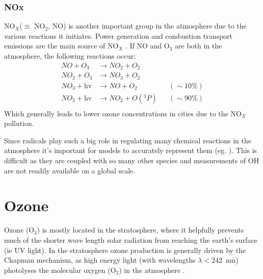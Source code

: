     \subsubsection{NOx}
      NO$_X$($\equiv $ NO$_2$, NO) is another important group in the atmosphere due to the various reactions it initiates.
      Power generation and combustion transport emissions are the main source of NO$_X$ .%
      If NO and O$_3$ are both in the atmosphere, the following reactions \citep{Atkinson2000} occur:
      \begin{equation}
      \begin{aligned}
      NO + O_3         & \to NO_2 + O_2      && \\%
      NO_2 + O_3       & \to NO_3 + O_2      && \\%
      NO_3 + \text{hv} & \to NO + O_2        && (\sim 10\%)  \\%
      NO_3 + \text{hv} & \to NO_2 + O({}^3P) && (\sim 90\%)  \\%
      \end{aligned}
      \label{LR:Atmos:Chem:eqn_O3toNO2}
      \end{equation}
      Which generally leads to lower ozone concentrations in cities due to the NO$_X$ pollution.
      
      Since radicals play such a big role in regulating many chemical reactions in the atmosphere it's important for models to accurately represent them (eg. \cite{Travis2014}). 
      This is difficult as they are coupled with so many other species and measurements of OH are not readily available on a global scale.
      
      

\section{Ozone}
\label{LR:O3}
  
  Ozone (O$_3$) is mostly located in the stratosphere, where it helpfully prevents much of the shorter wave length solar radiation from reaching the earth's surface (ie UV light).
  In the stratosphere ozone production is generally driven by the Chapman mechanism, as high energy light (with wavelengths $\lambda<242$~nm) photolyses the molecular oxygen (O$_2$) in the atmosphere \citep[][Chapter 3, section 2]{BrasseurJacob2017}.
  
